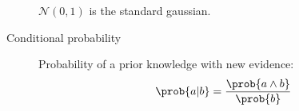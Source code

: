 \begin{description}
\begin{descriptionlist}
                $\mathcal{N}(0, 1)$ is the standard gaussian.
        \end{descriptionlist}

    \item[Conditional probability] 
        Probability of a prior knowledge with new evidence:
        \[ \prob{a \vert b} = \frac{\prob{a \land b}}{\prob{b}} \]
\end{description}